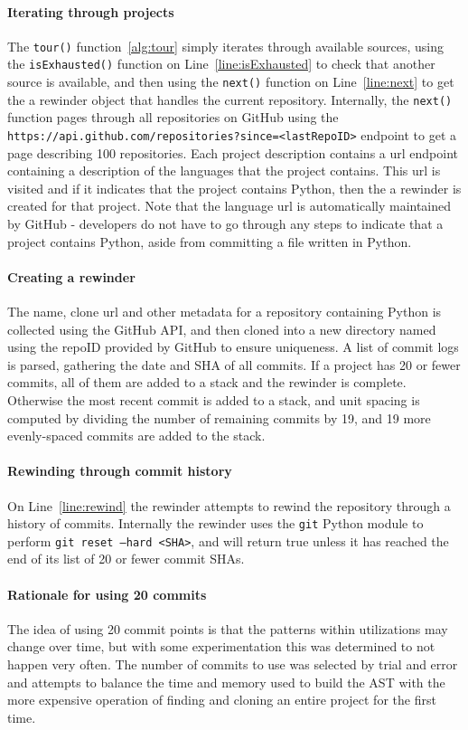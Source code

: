 \paragraph{Iterating through projects} The {\tt tour()} function~\ref{alg:tour} simply iterates through available sources, using the {\tt isExhausted()} function on Line~\ref{line:isExhausted} to check that another source is available, and then using the {\tt next()} function on Line~\ref{line:next} to get the a rewinder object that handles the current repository.  Internally, the {\tt next()} function pages through all repositories on GitHub using the {\tt https://api.github.com/repositories?since=<lastRepoID>} endpoint to get a page describing 100 repositories.  Each project description contains a url endpoint containing a description of the languages that the project contains.  This url is visited and if it indicates that the project contains Python, then the a rewinder is created for that project.  Note that the language url is automatically maintained by GitHub - developers do not have to go through any steps to indicate that a project contains Python, aside from committing a file written in Python.

\paragraph{Creating a rewinder}  The name, clone url and other metadata for a repository containing Python is collected using the GitHub API, and then cloned into a new directory named using the repoID provided by GitHub to ensure uniqueness.  A list of commit logs is parsed, gathering the date and SHA of all commits.  If a project has 20 or fewer commits, all of them are added to a stack and the rewinder is complete.  Otherwise the most recent commit is added to a stack, and unit spacing is computed by dividing the number of remaining commits by 19, and 19 more evenly-spaced commits are added to the stack.

\paragraph{Rewinding through commit history} On Line~\ref{line:rewind} the rewinder attempts to rewind the repository through a history of commits.  Internally the rewinder uses the {\tt git} Python module to perform {\tt git reset --hard <SHA>}, and will return true unless it has reached the end of its list of 20 or fewer commit SHAs.

\paragraph{Rationale for using 20 commits} The idea of using 20 commit points is that the patterns within utilizations may change over time, but with some experimentation this was determined to not happen very often.  The number of commits to use was selected by trial and error and attempts to balance the time and memory used to build the AST with the more expensive operation of finding and cloning an entire project for the first time.

